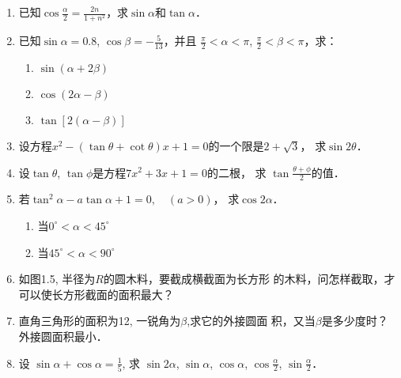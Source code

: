 \begin{enumerate}
\item 已知$\cos\frac{\alpha}{2}=\frac{2n}{1+n^2}$，求$\sin\alpha$和$\tan\alpha$．
\item 已知$\sin\alpha=0.8$, $\cos\beta=-\frac{5}{13}$，并且
$\frac{\pi}{2}<\alpha<\pi$, $\frac{\pi}{2}<\beta<\pi$，求：
\begin{enumerate}
    \item $\sin(\alpha+2\beta)$
    \item $\cos(2\alpha-\beta)$
    \item $\tan[2(\alpha-\beta)]$
\end{enumerate}
\item 设方程$x^2-(\tan \theta+\cot \theta)x+1=0$的一个限是$2+\sqrt{3}$，
求$\sin2\theta$．
\item 设$\tan \theta$, $\tan \phi$是方程$7x^2+3x+1=0$的二根，
求 $\tan\frac{\theta+\phi}{2}$的值．
\item 若$\tan^2 \alpha-a\tan \alpha+1=0,\quad (a>0)$，
求$\cos2\alpha$．
\begin{enumerate}
    \item 当$0^{\circ}<\alpha<45^{\circ}$
    \item 当$45^{\circ}<\alpha<90^{\circ}$
\end{enumerate}

\item 如图1.5, 半径为$R$的圆木料，要截成横截面为长方形
的木料，问怎样截取，才可以使长方形截面的面积最大？
\begin{figure}[htp]
    \centering
{}
    \caption{}
\end{figure}


\item 直角三角形的面积为12, 一锐角为$\beta$,求它的外接圆面
积，又当$\beta$是多少度时？外接圆面积最小．
\item 设 $\sin\alpha +\cos\alpha=\frac{1}{5}$,
求 $\sin2\alpha$, $\sin\alpha$, $\cos\alpha$, $\cos \frac{\alpha}{2}$, $\sin \frac{\alpha}{2}$．


\end{enumerate}
